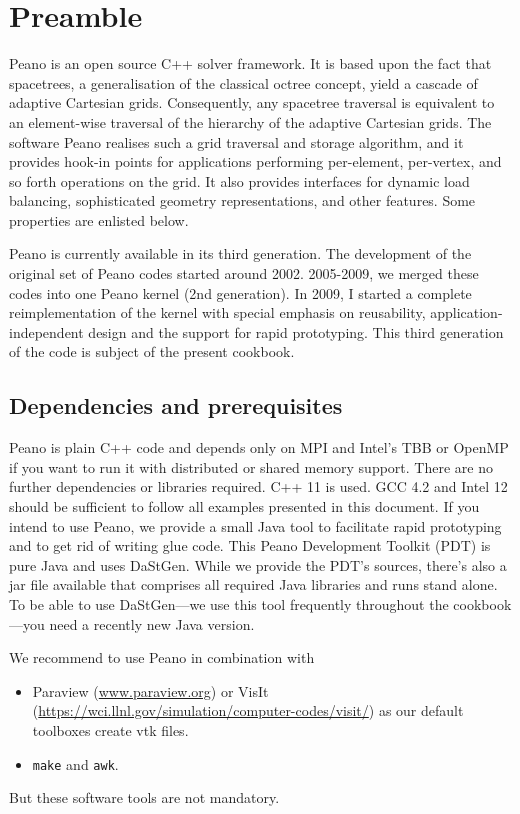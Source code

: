 \chapter{Preamble}


 Peano is an open source C++ solver framework. It is based upon the fact that spacetrees, a generalisation of the classical octree concept, yield a cascade of adaptive Cartesian grids. Consequently, any spacetree traversal is equivalent to an element-wise traversal of the hierarchy of the adaptive Cartesian grids. The software Peano realises such a grid traversal and storage algorithm, and it provides hook-in points for applications performing per-element, per-vertex, and so forth operations on the grid. It also provides interfaces for dynamic load balancing, sophisticated geometry representations, and other features. Some properties are enlisted below.

Peano is currently available in its third generation. 
The development of the original set of Peano codes started around 2002.
2005-2009, we merged these codes into one Peano kernel (2nd generation). 
In 2009, I started a complete reimplementation of the kernel with special
emphasis on reusability, application-independent design and the support for rapid prototyping. 
This third generation of the code is subject of the present cookbook.


\section*{Dependencies and prerequisites}

Peano is plain C++ code and depends only on MPI and Intel's TBB or OpenMP if you want to run it with distributed or shared memory support. 
There are no further dependencies or libraries required. 
C++ 11 is used. 
GCC 4.2 and Intel 12 should be sufficient to follow all examples presented in
this document.
If you intend to use Peano, we provide a small Java tool to facilitate rapid
prototyping and to get rid of writing glue code. 
This Peano Development Toolkit (PDT) is pure Java and uses DaStGen. 
While we provide the PDT's sources, there's also a jar file available that comprises all required Java libraries and runs stand alone.
To be able to use DaStGen---we use this tool frequently throughout the
cookbook---you need a recently new Java version.


We recommend to use Peano in combination with
\begin{itemize}
  \item Paraview (\url{www.paraview.org}) or VisIt
  (\url{https://wci.llnl.gov/simulation/computer-codes/visit/}) as our default
  toolboxes create vtk files.
  \item \texttt{make} and \texttt{awk}.
\end{itemize}
But these software tools are not mandatory.


